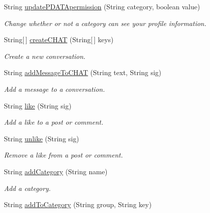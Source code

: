 \begin{DoxyCompactItemize}
String \hyperlink{classballmerpeak_1_1turtlenet_1_1server_1_1TurtlenetImpl_af50db109b6ae5adde4ac18a324a4aa66}{update\-P\-D\-A\-T\-Apermission} (String category, boolean value)
\begin{DoxyCompactList}\small\item\em Change whether or not a category can see your profile information. \end{DoxyCompactList}\item 
String\mbox{[}$\,$\mbox{]} \hyperlink{classballmerpeak_1_1turtlenet_1_1server_1_1TurtlenetImpl_a9dc47df7e7847ac053c189f38b9c7b14}{create\-C\-H\-A\-T} (String\mbox{[}$\,$\mbox{]} keys)
\begin{DoxyCompactList}\small\item\em Create a new conversation. \end{DoxyCompactList}\item 
String \hyperlink{classballmerpeak_1_1turtlenet_1_1server_1_1TurtlenetImpl_a89238dc6ef01ca846a4b616a1d510f85}{add\-Message\-To\-C\-H\-A\-T} (String text, String sig)
\begin{DoxyCompactList}\small\item\em Add a message to a conversation. \end{DoxyCompactList}\item 
String \hyperlink{classballmerpeak_1_1turtlenet_1_1server_1_1TurtlenetImpl_ab806c36948df3c570656cd02025f5188}{like} (String sig)
\begin{DoxyCompactList}\small\item\em Add a like to a post or comment. \end{DoxyCompactList}\item 
String \hyperlink{classballmerpeak_1_1turtlenet_1_1server_1_1TurtlenetImpl_a34dd5b2e3422a38ddd9ab2ded072e870}{unlike} (String sig)
\begin{DoxyCompactList}\small\item\em Remove a like from a post or comment. \end{DoxyCompactList}\item 
String \hyperlink{classballmerpeak_1_1turtlenet_1_1server_1_1TurtlenetImpl_abb2702210515c425be14f39584f761db}{add\-Category} (String name)
\begin{DoxyCompactList}\small\item\em Add a category. \end{DoxyCompactList}\item 
String \hyperlink{classballmerpeak_1_1turtlenet_1_1server_1_1TurtlenetImpl_af382d8d355b9a479d9c047fd9ae722ac}{add\-To\-Category} (String group, String key)

\end{DoxyCompactItemize}
